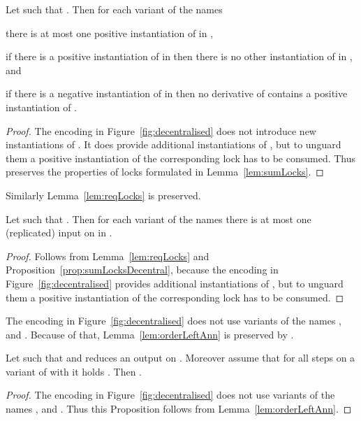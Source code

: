 \documentclass[]{eptcs}
\begin{document}
\begin{prop}
	Let  such that . Then for each variant  of the names 
	\begin{compactenum}
		\item there is at most one positive instantiation of  in ,
		\item if there is a positive instantiation of  in  then there is no other instantiation of  in , and
		\item if there is a negative instantiation of  in  then no derivative of  contains a positive instantiation of .
	\end{compactenum}
	\label{prop:sumLocksDecentral}
\end{prop}

\begin{proof}
	The encoding in Figure~\ref{fig:decentralised} does not introduce new instantiations of . It does provide additional instantiations of , but to unguard them a positive instantiation of the corresponding lock  has to be consumed. Thus  preserves the properties of locks formulated in Lemma~\ref{lem:sumLocks}.
\end{proof}

Similarly Lemma~\ref{lem:reqLocks} is preserved.

\begin{prop}
	Let  such that . Then for each variant  of the names  there is at most one (replicated) input on  in .
	\label{prop:reqLocksDecentral}
\end{prop}

\begin{proof}
	Follows from Lemma~\ref{lem:reqLocks} and Proposition~\ref{prop:sumLocksDecentral}, because the encoding in Figure~\ref{fig:decentralised} provides additional instantiations of , but to unguard them a positive instantiation of the corresponding lock  has to be consumed.
\end{proof}

The encoding in Figure~\ref{fig:decentralised} does not use variants of the names , and . Because of that, Lemma~\ref{lem:orderLeftAnn} is preserved by .

\begin{prop}
	Let  such that  and  reduces an output on . Moreover assume that for all steps  on a variant of  with  it holds .
	Then .
	\label{prop:orderLeftAnnDecentral}
\end{prop}

\begin{proof}
	The encoding in Figure~\ref{fig:decentralised} does not use variants of the names , and . Thus this Proposition follows from Lemma~\ref{lem:orderLeftAnn}.
\end{proof}
\end{document}
